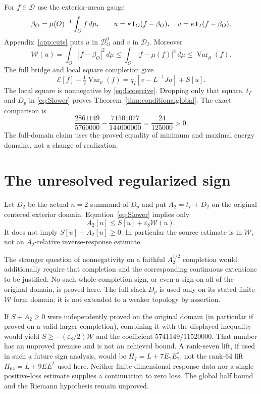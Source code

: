 \documentclass[11pt,a4paper]{article}
\numberwithin{equation}{section}
\theoremstyle{remark}\newtheorem{remark}[theorem]{Remark}
\newcommand{\E}{\mathcal E}\newcommand{\D}{\mathcal D}
\newcommand{\tg}{t_\Gamma}\newcommand{\cg}{c_\Gamma}
\newcommand{\Var}{\operatorname{Var}}\newcommand{\supp}{\operatorname{supp}}
\newcommand{\wo}{\mathcal W}\newcommand{\HS}{\mathrm{HS}}
\begin{document}
For $f\in\D$ use the exterior-mean gauge
\[
 \beta_O=\mu(O)^{-1}\int_Of\,d\mu,\qquad
 u=\kappa\mathbf1_O(f-\beta_O),\quad
 v=\kappa\mathbf1_I(f-\beta_O).
\]
Appendix~\ref{app:cuts} puts $u$ in $\D_O^0$ and $v$ in $\D_I$.
Moreover
\[
 \wo(u)=\int_O|f-\beta_O|^2\,d\mu
 \le\int_O|f-\mu(f)|^2\,d\mu\le\Var_\mu(f).
\]
The full bridge and local square completion give
\begin{equation}\label{eq:squaremain}
 \E[f]-\tfrac12\Var_\mu(f)=q_I[v-L^{-1}Ju]+S[u].
\end{equation}
The local square is nonnegative by \eqref{eq:Lcoercive}.
Dropping only that square, $\tg$ and $D_p$ in \eqref{eq:Slower} proves
Theorem~\ref{thm:conditionalglobal}.
The exact comparison is
\[
 \frac{2861149}{5760000}-\frac{71501077}{144000000}
 =\frac{24}{125000}>0.
\]
The full-domain claim uses the proved equality of minimum and maximal energy domains, not a change of realization.

\section{The unresolved regularized sign}\label{sec:limits}
Let $D_2$ be the actual $n=2$ summand of $D_p$ and put
$A_2=\tg+D_2$ on the original centered exterior domain.
Equation~\eqref{eq:Slower} implies only
\[
 A_2[u]\le S[u]+\varepsilon_8\wo(u).
\]
It does not imply $S[u]+A_2[u]\ge0$.
In particular the source estimate is in $\wo$, not an $A_2$-relative inverse-response estimate.

The stronger question of nonnegativity on a faithful $A_2^{1/2}$ completion would additionally require that completion and the corresponding continuous extensions to be justified.
No such whole-completion sign, or even a sign on all of the original domain, is proved here.
The full slack $D_p$ is used only on its stated finite-$\wo$ form domain; it is not extended to a weaker topology by assertion.

If $S+A_2\ge0$ were independently proved on the original domain (in particular if proved on a valid larger completion), combining it with the displayed inequality would yield
$S\ge-(\varepsilon_8/2)\wo$ and the coefficient
$5741149/11520000$.
That number has an unproved premise and is not an achieved bound.
A rank-seven lift, if used in such a future sign analysis, would be
$H_7=L+7E_7E_7^*$, not the rank-64 lift $H_{64}=L+9EE^*$ used here.
Neither finite-dimensional response data nor a single positive-loss estimate supplies a continuation to zero loss.
The global half bound and the Riemann hypothesis remain unproved.
\end{document}
